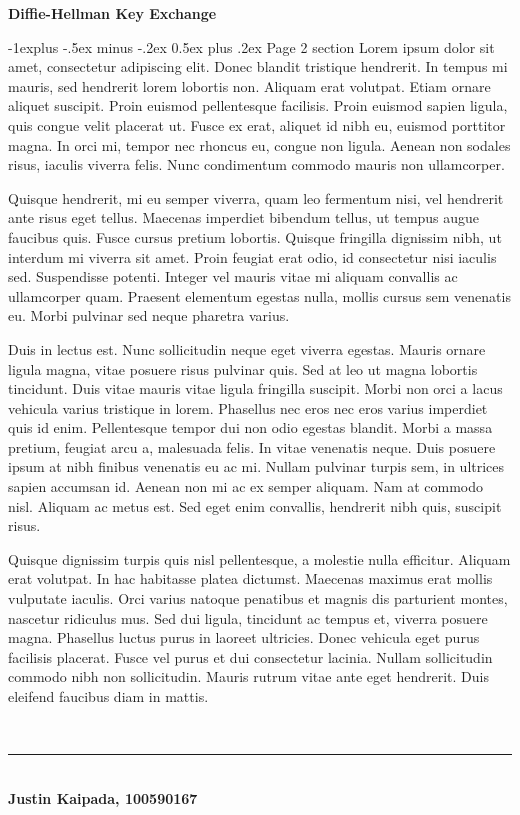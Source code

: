 \documentclass[10pt,landscape]{article}
\makeatletter
\renewcommand{\subsection}{\@startsection{subsection}{2}{0mm}%
    {-1explus -.5ex minus -.2ex}%
    {0.5ex plus .2ex}%
    {\normalfont\normalsize\bfseries}}
\makeatother
\begin{document}
\begin{multicols}{3}
\textbf{Diffie-Hellman Key Exchange}


\subsection{Page 2 section}
Lorem ipsum dolor sit amet, consectetur adipiscing elit. Donec blandit
tristique hendrerit. In tempus mi mauris, sed hendrerit lorem lobortis
non. Aliquam erat volutpat. Etiam ornare aliquet suscipit. Proin
euismod pellentesque facilisis. Proin euismod sapien ligula, quis
congue velit placerat ut. Fusce ex erat, aliquet id nibh eu, euismod
porttitor magna. In orci mi, tempor nec rhoncus eu, congue non
ligula. Aenean non sodales risus, iaculis viverra felis. Nunc
condimentum commodo mauris non ullamcorper.

Quisque hendrerit, mi eu semper viverra, quam leo fermentum nisi, vel
hendrerit ante risus eget tellus. Maecenas imperdiet bibendum tellus,
ut tempus augue faucibus quis. Fusce cursus pretium lobortis. Quisque
fringilla dignissim nibh, ut interdum mi viverra sit amet. Proin
feugiat erat odio, id consectetur nisi iaculis sed. Suspendisse
potenti. Integer vel mauris vitae mi aliquam convallis ac ullamcorper
quam. Praesent elementum egestas nulla, mollis cursus sem venenatis
eu. Morbi pulvinar sed neque pharetra varius.

Duis in lectus est. Nunc sollicitudin neque eget viverra
egestas. Mauris ornare ligula magna, vitae posuere risus pulvinar
quis. Sed at leo ut magna lobortis tincidunt. Duis vitae mauris vitae
ligula fringilla suscipit. Morbi non orci a lacus vehicula varius
tristique in lorem. Phasellus nec eros nec eros varius imperdiet quis
id enim. Pellentesque tempor dui non odio egestas blandit. Morbi a
massa pretium, feugiat arcu a, malesuada felis. In vitae venenatis
neque. Duis posuere ipsum at nibh finibus venenatis eu ac mi. Nullam
pulvinar turpis sem, in ultrices sapien accumsan id. Aenean non mi ac
ex semper aliquam. Nam at commodo nisl. Aliquam ac metus est. Sed eget
enim convallis, hendrerit nibh quis, suscipit risus.

Quisque dignissim turpis quis nisl pellentesque, a molestie nulla
efficitur. Aliquam erat volutpat. In hac habitasse platea
dictumst. Maecenas maximus erat mollis vulputate iaculis. Orci varius
natoque penatibus et magnis dis parturient montes, nascetur ridiculus
mus. Sed dui ligula, tincidunt ac tempus et, viverra posuere
magna. Phasellus luctus purus in laoreet ultricies. Donec vehicula
eget purus facilisis placerat. Fusce vel purus et dui consectetur
lacinia. Nullam sollicitudin commodo nibh non sollicitudin. Mauris
rutrum vitae ante eget hendrerit. Duis eleifend faucibus diam in
mattis.

~\\

\vfill
\hrule
~\\
\textbf{Justin Kaipada, 100590167}
\end{multicols}
\end{document}
